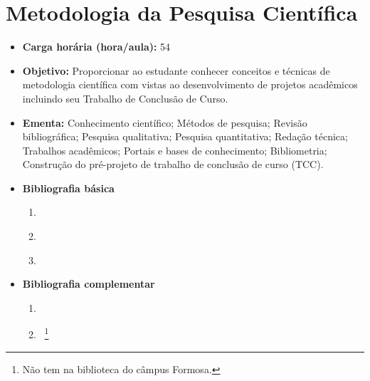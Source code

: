 \documentclass[11pt,fleqn]{book} %
\begin{document}
\section{Metodologia da Pesquisa Científica}\label{5_metodologia}
\begin{itemize}
	\item \textbf{Carga horária (hora/aula):} 54
	\item \textbf{Objetivo:} Proporcionar ao estudante conhecer conceitos e técnicas de metodologia científica com vistas ao desenvolvimento de projetos acadêmicos incluindo seu Trabalho de Conclusão de Curso.
	\item \textbf{Ementa:} 
	Conhecimento científico;
	Métodos de pesquisa; 
	Revisão bibliográfica;
	Pesquisa qualitativa;
	Pesquisa quantitativa; 
	Redação técnica;
	Trabalhos acadêmicos;
	Portais e bases de conhecimento;
	Bibliometria;
	Construção do pré-projeto de trabalho de conclusão de curso (TCC).
	\item \textbf{Bibliografia básica}
	\begin{enumerate}
		\item \cite{Andrade2005introduccao}
		\item \cite{gil2002elaborar}
		\item \cite{wazlawick2017metodologia}
	\end{enumerate}
	\item \textbf{Bibliografia complementar}
	\begin{enumerate}
		\item \cite{koche2016fundamentos}
		\item \cite{aquino2017escrever}~\footnote{Não tem na biblioteca do câmpus Formosa.}
	\end{enumerate} 	
\end{itemize}


\newpage
\end{document}
